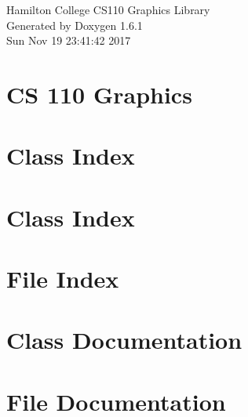 \documentclass[a4paper]{book}
\begin{document}
\hypersetup{pageanchor=false}
\begin{titlepage}
\vspace*{7cm}
\begin{center}
{\Large Hamilton College CS110 Graphics Library }\\
\vspace*{1cm}
{\large Generated by Doxygen 1.6.1}\\
\vspace*{0.5cm}
{\small Sun Nov 19 23:41:42 2017}\\
\end{center}
\end{titlepage}
\clearemptydoublepage
{}
\tableofcontents
\clearemptydoublepage
{}
\hypersetup{pageanchor=true}
\chapter{CS 110 Graphics}
\label{index}\hypertarget{index}{}
\chapter{Class Index}

\chapter{Class Index}

\chapter{File Index}

\chapter{Class Documentation}













\chapter{File Documentation}

\printindex
\end{document}
